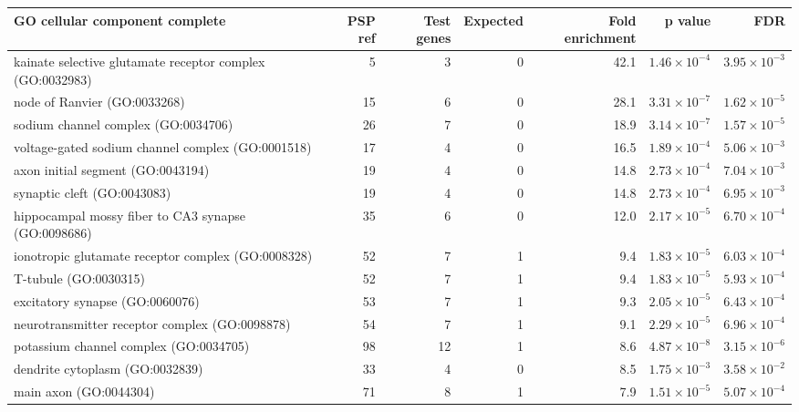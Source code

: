 \begin{table}[ht]
\centering
\begin{adjustbox}{width=\textwidth}

\begin{tabular}{lrrrrrr}
  \hline
GO cellular component complete & PSP ref & Test genes & Expected & Fold enrichment & p value & FDR \\ 
  \hline
kainate selective glutamate receptor complex (GO:0032983) & 5 & 3 & 0 & 42.1 & $1.46 \times 10^{-4}$ & $3.95 \times 10^{-3}$ \\ 
  node of Ranvier (GO:0033268) & 15 & 6 & 0 & 28.1 & $3.31 \times 10^{-7}$ & $1.62 \times 10^{-5}$ \\ 
  sodium channel complex (GO:0034706) & 26 & 7 & 0 & 18.9 & $3.14 \times 10^{-7}$ & $1.57 \times 10^{-5}$ \\ 
  voltage-gated sodium channel complex (GO:0001518) & 17 & 4 & 0 & 16.5 & $1.89 \times 10^{-4}$ & $5.06 \times 10^{-3}$ \\ 
  axon initial segment (GO:0043194) & 19 & 4 & 0 & 14.8 & $2.73 \times 10^{-4}$ & $7.04 \times 10^{-3}$ \\ 
  synaptic cleft (GO:0043083) & 19 & 4 & 0 & 14.8 & $2.73 \times 10^{-4}$ & $6.95 \times 10^{-3}$ \\ 
  hippocampal mossy fiber to CA3 synapse (GO:0098686) & 35 & 6 & 0 & 12.0 & $2.17 \times 10^{-5}$ & $6.70 \times 10^{-4}$ \\ 
  ionotropic glutamate receptor complex (GO:0008328) & 52 & 7 & 1 & 9.4 & $1.83 \times 10^{-5}$ & $6.03 \times 10^{-4}$ \\ 
  T-tubule (GO:0030315) & 52 & 7 & 1 & 9.4 & $1.83 \times 10^{-5}$ & $5.93 \times 10^{-4}$ \\ 
  excitatory synapse (GO:0060076) & 53 & 7 & 1 & 9.3 & $2.05 \times 10^{-5}$ & $6.43 \times 10^{-4}$ \\ 
  neurotransmitter receptor complex (GO:0098878) & 54 & 7 & 1 & 9.1 & $2.29 \times 10^{-5}$ & $6.96 \times 10^{-4}$ \\ 
  potassium channel complex (GO:0034705) & 98 & 12 & 1 & 8.6 & $4.87 \times 10^{-8}$ & $3.15 \times 10^{-6}$ \\ 
  dendrite cytoplasm (GO:0032839) & 33 & 4 & 0 & 8.5 & $1.75 \times 10^{-3}$ & $3.58 \times 10^{-2}$ \\ 
  main axon (GO:0044304) & 71 & 8 & 1 & 7.9 & $1.51 \times 10^{-5}$ & $5.07 \times 10^{-4}$ \\ 

\end{tabular}
\end{adjustbox}
\end{table}
